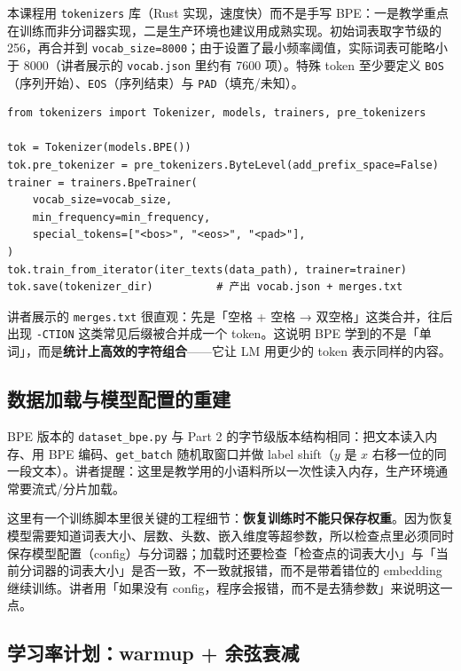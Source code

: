 本课程用 \texttt{tokenizers} 库（Rust 实现，速度快）而不是手写 BPE：一是教学重点在训练而非分词器实现，二是生产环境也建议用成熟实现。初始词表取字节级的 256，再合并到 \texttt{vocab\_size=8000}；由于设置了最小频率阈值，实际词表可能略小于 8000（讲者展示的 \texttt{vocab.json} 里约有 7600 项）。特殊 token 至少要定义 \texttt{BOS}（序列开始）、\texttt{EOS}（序列结束）与 \texttt{PAD}（填充/未知）。

\begin{lstlisting}[caption={BPE 分词器的训练与保存（据视频 \texttt{tokenizer\_bpe.py} 整理）：用 \texttt{BpeTrainer} 指定词表大小、最小频率与特殊 token，在文本文件迭代器上训练后保存。}]
from tokenizers import Tokenizer, models, trainers, pre_tokenizers

tok = Tokenizer(models.BPE())
tok.pre_tokenizer = pre_tokenizers.ByteLevel(add_prefix_space=False)
trainer = trainers.BpeTrainer(
    vocab_size=vocab_size,
    min_frequency=min_frequency,
    special_tokens=["<bos>", "<eos>", "<pad>"],
)
tok.train_from_iterator(iter_texts(data_path), trainer=trainer)
tok.save(tokenizer_dir)          # 产出 vocab.json + merges.txt
\end{lstlisting}

讲者展示的 \texttt{merges.txt} 很直观：先是「空格 + 空格 → 双空格」这类合并，往后出现 \texttt{-CTION} 这类常见后缀被合并成一个 token。这说明 BPE 学到的不是「单词」，而是\textbf{统计上高效的字符组合}——它让 LM 用更少的 token 表示同样的内容。

\subsection{数据加载与模型配置的重建}

BPE 版本的 \texttt{dataset\_bpe.py} 与 Part 2 的字节级版本结构相同：把文本读入内存、用 BPE 编码、\texttt{get\_batch} 随机取窗口并做 label shift（$y$ 是 $x$ 右移一位的同一段文本）。讲者提醒：这里是教学用的小语料所以一次性读入内存，生产环境通常要流式/分片加载。

这里有一个训练脚本里很关键的工程细节：\textbf{恢复训练时不能只保存权重}。因为恢复模型需要知道词表大小、层数、头数、嵌入维度等超参数，所以检查点里必须同时保存模型配置（config）与分词器；加载时还要检查「检查点的词表大小」与「当前分词器的词表大小」是否一致，不一致就报错，而不是带着错位的 embedding 继续训练。讲者用「如果没有 config，程序会报错，而不是去猜参数」来说明这一点。

\subsection{学习率计划：warmup + 余弦衰减}

